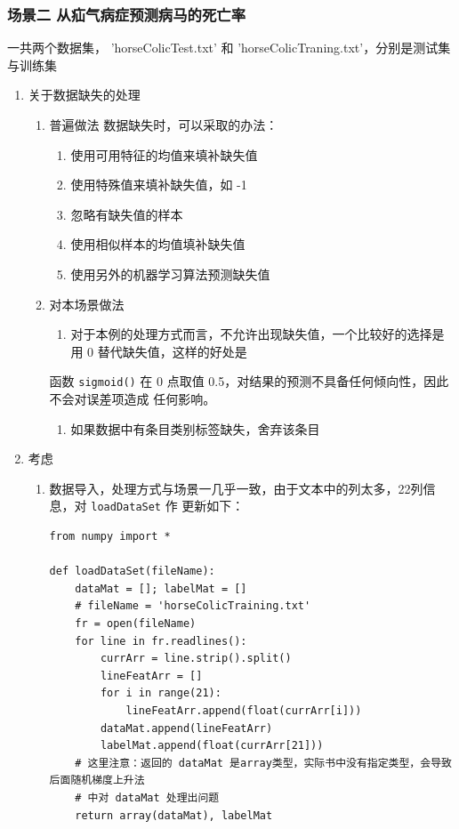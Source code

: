 \documentclass[11pt]{ctexart}
\begin{document}
\subsubsection{场景二 从疝气病症预测病马的死亡率}
\label{sec:orgheadline64}
一共两个数据集， 'horseColicTest.txt' 和 'horseColicTraning.txt'，分别是测试集与训练集
\begin{enumerate}
\item 关于数据缺失的处理
\label{sec:orgheadline62}
\begin{enumerate}
\item 普遍做法
\label{sec:orgheadline60}
数据缺失时，可以采取的办法：
\begin{enumerate}
\item 使用可用特征的均值来填补缺失值
\item 使用特殊值来填补缺失值，如 -1
\item 忽略有缺失值的样本
\item 使用相似样本的均值填补缺失值
\item 使用另外的机器学习算法预测缺失值
\end{enumerate}
\item 对本场景做法
\label{sec:orgheadline61}
\begin{enumerate}
\item 对于本例的处理方式而言，不允许出现缺失值，一个比较好的选择是用 0 替代缺失值，这样的好处是
\end{enumerate}
函数 \texttt{sigmoid()} 在 0 点取值 0.5，对结果的预测不具备任何倾向性，因此不会对误差项造成
任何影响。
\begin{enumerate}
\item 如果数据中有条目类别标签缺失，舍弃该条目
\end{enumerate}
\end{enumerate}
\item 考虑
\label{sec:orgheadline63}
\begin{enumerate}
\item 数据导入，处理方式与场景一几乎一致，由于文本中的列太多，22列信息，对 \texttt{loadDataSet} 作
更新如下：
\lstset{language=Python,label= ,caption= ,captionpos=b,numbers=none}
\begin{lstlisting}
from numpy import *

def loadDataSet(fileName):
    dataMat = []; labelMat = []
    # fileName = 'horseColicTraining.txt'
    fr = open(fileName)
    for line in fr.readlines():
        currArr = line.strip().split()
        lineFeatArr = []
        for i in range(21):
            lineFeatArr.append(float(currArr[i]))
        dataMat.append(lineFeatArr)
        labelMat.append(float(currArr[21]))
    # 这里注意：返回的 dataMat 是array类型，实际书中没有指定类型，会导致后面随机梯度上升法
    # 中对 dataMat 处理出问题
    return array(dataMat), labelMat
\end{lstlisting}


\end{enumerate}
\end{enumerate}
\end{document}
